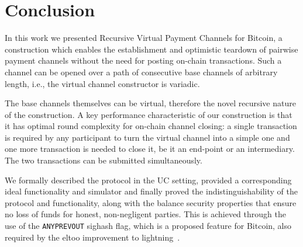 \section{Conclusion}

  In this work we presented Recursive Virtual Payment Channels for Bitcoin, a
  construction which enables the establishment and optimistic teardown of
  pairwise payment channels without the need for posting on-chain transactions.
  Such a channel can be opened over a path of consecutive base channels of
  arbitrary length, i.e., the virtual channel constructor is variadic.

  The base channels themselves can be virtual, therefore the novel recursive
  nature of the construction. A key performance characteristic of our
  construction is that it has optimal round complexity for on-chain channel
  closing: a single transaction is required by any participant to turn the
  virtual channel into a simple one and one more transaction is needed to close
  it, be it an end-point or an intermediary. The two transactions can be
  submitted simultaneously.

  We formally described the protocol in the UC setting, provided a corresponding
  ideal functionality and simulator and finally proved the indistinguishability
  of the protocol and functionality, along with the balance security properties
  that ensure no loss of funds for honest, non-negligent parties. This is
  achieved through the use of the \texttt{ANYPREVOUT} sighash flag, which is a
  proposed feature for Bitcoin, also required by the eltoo improvement to
  lightning~\cite{eltoo}.

\newpage
